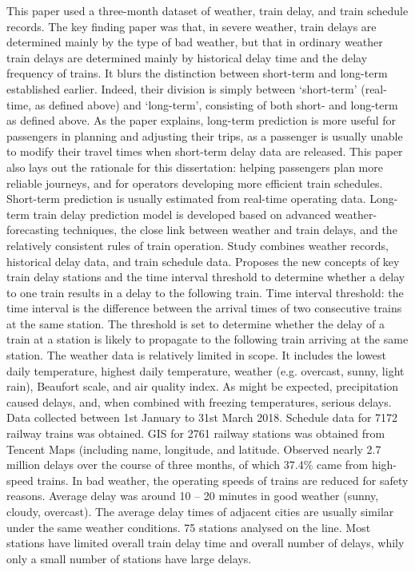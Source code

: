 \documentclass{article}
\begin{document}
This paper used a three-month dataset of weather, train delay, and train schedule records. The key finding paper was that, in severe weather, train delays are determined mainly by the type of bad weather, but that in ordinary weather train delays are determined mainly by historical delay time and the delay frequency of trains. 
It blurs the distinction between short-term and long-term established earlier. Indeed, their division is simply between ‘short-term’ (real-time, as defined above) and ‘long-term’, consisting of both short- and long-term as defined above. 
As the paper explains, long-term prediction is more useful for passengers in planning and adjusting their trips, as a passenger is usually unable to modify their travel times when short-term delay data are released. 
This paper also lays out the rationale for this dissertation: helping passengers plan more reliable journeys, and for operators developing more efficient train schedules. 
Short-term prediction is usually estimated from real-time operating data. 
Long-term train delay prediction model is developed based on advanced weather-forecasting techniques, the close link between weather and train delays, and the relatively consistent rules of train operation. Study combines weather records, historical delay data, and train schedule data. 
Proposes the new concepts of key train delay stations and the time interval threshold to determine whether a delay to one train results in a delay to the following train. 
Time interval threshold: the time interval is the difference between the arrival times of two consecutive trains at the same station. The threshold is set to determine whether the delay of a train at a station is likely to propagate to the following train arriving at the same station. 
The weather data is relatively limited in scope. It includes the lowest daily temperature, highest daily temperature, weather (e.g. overcast, sunny, light rain), Beaufort scale, and air quality index. As might be expected, precipitation caused delays, and, when combined with freezing temperatures, serious delays.
Data collected between 1st January to 31st March 2018.
Schedule data for 7172 railway trains was obtained. GIS for 2761 railway stations was obtained from Tencent Maps (including name, longitude, and latitude. Observed nearly 2.7 million delays over the course of three months, of which 37.4\% came from high-speed trains. 
In bad weather, the operating speeds of trains are reduced for safety reasons. Average delay was around 10 – 20 minutes in good weather (sunny, cloudy, overcast). The average delay times of adjacent cities are usually similar under the same weather conditions. 75 stations analysed on the line. Most stations have limited overall train delay time and overall number of delays, whily only a small number of stations have large delays. 
\end{document}

